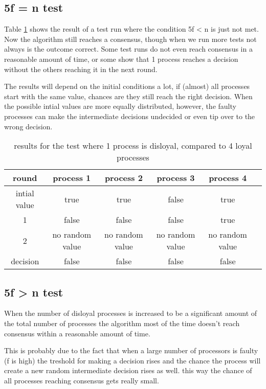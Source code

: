 \subsection{5f = n test}
Table \ref{table:resultsBoundaryDisloyal} shows the result of a test run where the condition 5f < n is just not met. 
Now the algorithm still reaches a consensus, though when we run more tests not always is the outcome correct.
Some test runs do not even reach consensus in a reasonable amount of time, or some show that 1 process reaches a decision without the others reaching it in the next round. 

The results will depend on the initial conditions a lot, if (almost) all processes start with the same value, chances are they still reach the right decision. When the possible intial values are more equally distributed, however, the faulty processes can make the intermediate decisions undecided or even tip over to the wrong decision.

\begin{table}[h]
	\begin{tabular}{ | c | c  | c  | c| c | c |}
		\hline
  		round & process 1 & process 2 & process 3 & process 4  \\
		\hline
 		intial value &  true & true & false & true\\
		\hline
		1  &  false & false & false  & true  \\
		\hline
		2  &  no random value &  no random value & no random value &  no random value \\
		\hline
  		decision  &  false & false & false  & false  \\
		\hline
	\end{tabular}
	\caption{results for the test where 1 process is disloyal, compared to 4 loyal processes}	
	\label{table:resultsBoundaryDisloyal}
\end{table}

\subsection{5f > n test}
 
When the number of disloyal processes is increased to be a significant amount of the total number of processes the algorithm most of the time doesn't reach consensus within a reasonable amount of time. 

This is probably due to the fact that when a large number of processors is faulty (f is high) the treshold for making a decision rises and the chance the process will create a new random intermediate decision rises as well. this way the chance of all processes reaching consensus gets really small.


